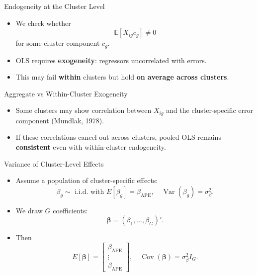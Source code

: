 \documentclass[
  ignorenonframetext,
]{beamer}
\providecommand{\tightlist}{%
  \setlength{\itemsep}{0pt}\setlength{\parskip}{0pt}}
\begin{document}
\begin{frame}{Endogeneity at the Cluster Level}
\label{endogeneity-at-the-cluster-level}
\begin{itemize}
\tightlist
\item
  We check whether\\
  \[
  \mathbb{E}[X_{ig} c_g] \neq 0
  \] for some cluster component \(c_g\).\\
\item
  OLS requires \textbf{exogeneity}: regressors uncorrelated with
  errors.\\
\item
  This may fail \textbf{within} clusters but hold \textbf{on average
  across clusters}.
\end{itemize}
\end{frame}

\begin{frame}{Aggregate vs Within-Cluster Exogeneity}
\label{aggregate-vs-within-cluster-exogeneity}
\begin{itemize}
\tightlist
\item
  Some clusters may show correlation between \(X_{ig}\) and the
  cluster-specific error component (Mundlak, 1978).\\
\item
  If these correlations cancel out across clusters, pooled OLS remains
  \textbf{consistent} even with within-cluster endogeneity.
\end{itemize}
\end{frame}

\begin{frame}{Variance of Cluster-Level Effects}
\label{variance-of-cluster-level-effects}
\begin{itemize}
\tightlist
\item
  Assume a population of cluster-specific effects: \[
  \beta_g \sim \text{ i.i.d. with } 
  E[\beta_g] = \beta_{\text{APE}},\quad
  \operatorname{Var}(\beta_g) = \sigma^2_\beta.
  \]
\item
  We draw \(G\) coefficients: \[
  \boldsymbol{\beta} = (\beta_1,\dots,\beta_G)'.
  \]
\item
  Then \[
  E[\boldsymbol{\beta}] = 
  \begin{bmatrix}
  \beta_{\text{APE}} \\
  \vdots \\
  \beta_{\text{APE}}
  \end{bmatrix},\quad
  \operatorname{Cov}(\boldsymbol{\beta}) =
  \sigma^2_\beta I_G.
  \]
\end{itemize}
\end{frame}
\end{document}
